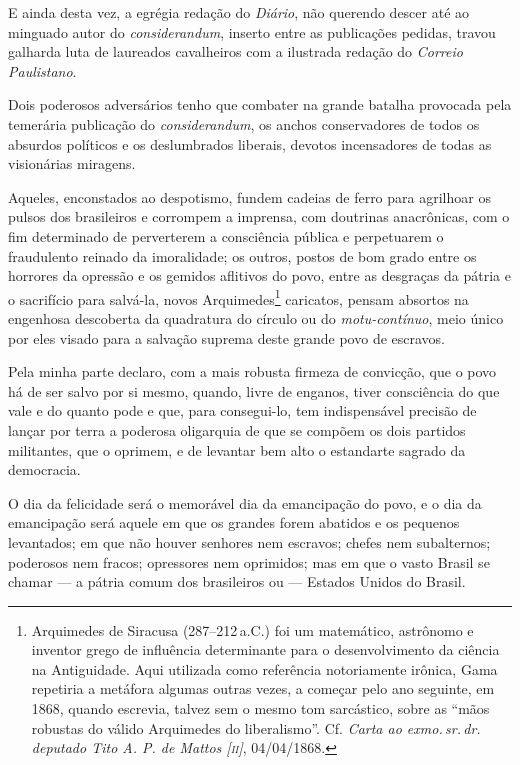 E ainda desta vez, a egrégia redação do \emph{Diário}, não querendo
descer até ao minguado autor do \textit{considerandum}, inserto entre as
publicações pedidas, travou galharda luta de laureados cavalheiros com a
ilustrada redação do \emph{Correio Paulistano}.

Dois poderosos adversários tenho que combater na grande batalha
provocada pela temerária publicação do \textit{considerandum}, os anchos
conservadores de todos os absurdos políticos e os deslumbrados liberais,
devotos incensadores de todas as visionárias miragens.

Aqueles, enconstados ao despotismo, fundem cadeias de ferro para
agrilhoar os pulsos dos brasileiros e corrompem a imprensa, com
doutrinas anacrônicas, com o fim determinado de perverterem a
consciência pública e perpetuarem o fraudulento reinado da imoralidade;
os outros, postos de bom grado entre os horrores da opressão e os
gemidos aflitivos do povo, entre as desgraças da pátria e o sacrifício
para salvá-la, novos Arquimedes\footnote{Arquimedes de Siracusa (287--212\,a.C.) 
foi um matemático, astrônomo e inventor grego de
  influência determinante para o desenvolvimento da ciência na
  Antiguidade. Aqui utilizada como referência notoriamente irônica, Gama
  repetiria a metáfora algumas outras vezes, a começar pelo ano
  seguinte, em 1868, quando escrevia, talvez sem o mesmo tom sarcástico,
  sobre as ``mãos robustas do válido Arquimedes do liberalismo''. Cf.
  \emph{Carta ao exmo.\,sr.\,dr.\,deputado Tito A. P. de Mattos {[}\textsc{ii}{]}},
  04/04/1868.\label{arquimedes}} caricatos, pensam absortos na engenhosa descoberta da
quadratura do círculo ou do \emph{motu-contínuo}, meio único por eles
visado para a salvação suprema deste grande povo de escravos.

Pela minha parte declaro, com a mais robusta firmeza de convicção, que o
povo há de ser salvo por si mesmo, quando, livre de enganos, tiver
consciência do que vale e do quanto pode e que, para consegui-lo, tem
indispensável precisão de lançar por terra a poderosa oligarquia de que
se compõem os dois partidos militantes, que o oprimem, e de levantar bem
alto o estandarte sagrado da democracia.

O dia da felicidade será o memorável dia da emancipação do povo, e o dia
da emancipação será aquele em que os grandes forem abatidos e os
pequenos levantados; em que não houver senhores nem escravos; chefes nem
subalternos; poderosos nem fracos; opressores nem oprimidos; mas em que
o vasto Brasil se chamar --- a pátria comum dos brasileiros ou --- Estados
Unidos do Brasil.

